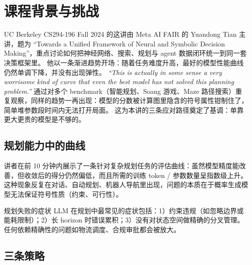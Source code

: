 \section{课程背景与挑战}

UC Berkeley CS294-196 Fall 2024 的这讲由 Meta AI FAIR 的 Yuandong Tian 主讲，题为 ``Towards a Unified Framework of Neural and Symbolic Decision Making''，重点讨论如何把神经网络、搜索、规划与 agent 数据闭环统一到同一套决策框架里。
他以一条渐进趋势开场：随着任务难度升高，最好的模型性能曲线仍然单调下降，并没有出现弹性。
\textit{``This is actually in some sense a very worrisome kind of curve that even the best model has not solved this planning problem.''}
通过对多个 benchmark（智能规划、Soang 游戏、Maze 路径搜索）重复观察，同样的趋势一再出现：模型的分数被计算图里隐含的符号属性钳制住了，简单堆参数段时间内无法打开局面。
这为本讲的三条应对路径奠定了基调：单靠更大更贵的模型是不够的。

\subsection{规划能力中的曲线}

讲者在前 10 分钟内展示了一条针对复杂规划任务的评估曲线：虽然模型精度能改善，但收敛后的得分仍然偏低，而且所需的训练 token / 参数数量呈指数级上升。
这种现象反复在对话、自动规划、机器人导航里出现，问题的本质在于概率生成模型无法保证符号性质（约束、可行性）。
\begin{knowledgebox}{规划失败的症状}
LLM 在规划中最常见的症状包括：1）约束违规（如忽略边界或能耗限制）；2）长 horizon 时错误累积；3）没有对状态空间做精确的分叉管理。任何依赖精确性的问题如物流调度、合规审批都会被放大。
\end{knowledgebox}

\subsection{三条策略}

